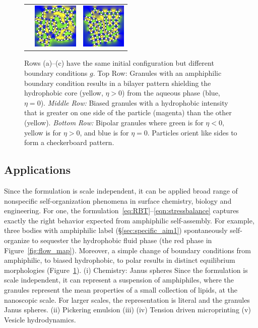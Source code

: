 \begin{figure}
\begin{center}
\begin{tabular}{m{0.9in}m{0.9in}m{0.9in}}
      &\includegraphics[width=0.85in]{figures/SpecificAim1/N100A2.jpg}
      &\includegraphics[width=0.85in]{figures/SpecificAim1/N100A3.jpg} 
  \end{tabular}
  \end{center}
  \vspace{-5pt}
  \caption{\footnotesize \label{fig:self-assembly2} Rows (a)--(c) have
  the same initial configuration but different boundary conditions $g$.
  {Top Row:} Granules with an amphiphilic boundary condition
  results in a bilayer pattern shielding the hydrophobic core (yellow,
  $\eta > 0$) from the aqueous phase (blue, $\eta = 0$). {\em Middle
  Row:} Biased granules with a hydrophobic intensity that is greater on
  one side of the particle (magenta) than the other (yellow). {\em
  Bottom Row:} Bipolar granules where green is for $\eta < 0$, yellow is
  for $\eta > 0$, and blue is for $\eta = 0$. Particles orient like
  sides to form a checkerboard pattern.}
\end{figure}

\subsection{Applications}
Since the formulation is scale independent, it can be applied broad
range of nonspecific self-organization phenomena in surface chemistry,
biology and engineering. For one, the
formulation~\eqref{eq:RBT}--\eqref{eqn:stressbalance} captures exactly
the right behavior expected from amphiphilic self-assembly. For example,
three bodies with amphiphilic label (\S\ref{sec:specific_aim1})
spontaneously self-organize to sequester the hydrophobic fluid phase
(the red phase in Figure~\ref{fig:flow_map}).  Moreover, a simple change
of boundary conditions from amphiphilic, to biased hydrophobic, to polar
results in distinct equilibrium morphologies
(Figure~\ref{fig:self-assembly2}). (i) Chemistry: Janus spheres Since
the formulation is scale independent, it can represent a suspension of
amphiphiles, where the granules represent the mean properties of a small
collection of lipids, at the nanoscopic scale. For larger scales, the
representation is literal and the granules Janus spheres. (ii) Pickering
emulsion (iii)  (iv) Tension driven
microprinting (v) Vesicle hydrodynamics.

